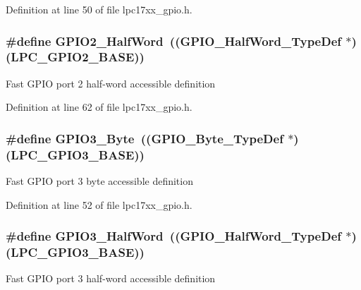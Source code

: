 \-Definition at line 50 of file lpc17xx\-\_\-gpio.\-h.

\hypertarget{group___g_p_i_o___public___macros_ga2bf1837541e93e32013115a2d60c9609}{
\subsubsection[{\-G\-P\-I\-O2\-\_\-\-Half\-Word}]{\setlength{\rightskip}{0pt plus 5cm}\#define {\bf \-G\-P\-I\-O2\-\_\-\-Half\-Word}~(({\bf \-G\-P\-I\-O\-\_\-\-Half\-Word\-\_\-\-Type\-Def} $\ast$)(\-L\-P\-C\-\_\-\-G\-P\-I\-O2\-\_\-\-B\-A\-S\-E))}}\label{group___g_p_i_o___public___macros_ga2bf1837541e93e32013115a2d60c9609}
\-Fast \-G\-P\-I\-O port 2 half-\/word accessible definition 

\-Definition at line 62 of file lpc17xx\-\_\-gpio.\-h.

\hypertarget{group___g_p_i_o___public___macros_ga51a2f5fc99e06509aabe77fef292503b}{
\subsubsection[{\-G\-P\-I\-O3\-\_\-\-Byte}]{\setlength{\rightskip}{0pt plus 5cm}\#define {\bf \-G\-P\-I\-O3\-\_\-\-Byte}~(({\bf \-G\-P\-I\-O\-\_\-\-Byte\-\_\-\-Type\-Def} $\ast$)(\-L\-P\-C\-\_\-\-G\-P\-I\-O3\-\_\-\-B\-A\-S\-E))}}\label{group___g_p_i_o___public___macros_ga51a2f5fc99e06509aabe77fef292503b}
\-Fast \-G\-P\-I\-O port 3 byte accessible definition 

\-Definition at line 52 of file lpc17xx\-\_\-gpio.\-h.

\hypertarget{group___g_p_i_o___public___macros_gadb3ef5b918d80a4b0b70a0f0ff74fe5e}{
\subsubsection[{\-G\-P\-I\-O3\-\_\-\-Half\-Word}]{\setlength{\rightskip}{0pt plus 5cm}\#define {\bf \-G\-P\-I\-O3\-\_\-\-Half\-Word}~(({\bf \-G\-P\-I\-O\-\_\-\-Half\-Word\-\_\-\-Type\-Def} $\ast$)(\-L\-P\-C\-\_\-\-G\-P\-I\-O3\-\_\-\-B\-A\-S\-E))}}\label{group___g_p_i_o___public___macros_gadb3ef5b918d80a4b0b70a0f0ff74fe5e}
\-Fast \-G\-P\-I\-O port 3 half-\/word accessible definition 

